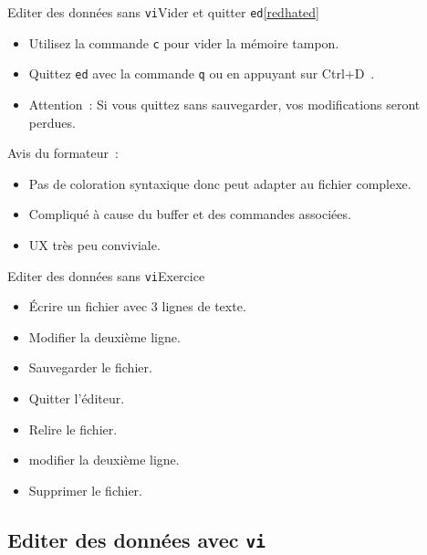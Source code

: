 \documentclass{beamer}
\begin{document}
    \begin{frame}{Editer des données sans \lstinline{vi}}{Vider et quitter \lstinline{ed}\cref{redhated}}
        \begin{itemize}
            \item Utilisez la commande \lstinline{c} pour vider la mémoire tampon.
            \item Quittez \lstinline{ed} avec la commande \lstinline{q} ou en appuyant sur Ctrl+D~.
            \item Attention~: Si vous quittez sans sauvegarder, vos modifications seront perdues.
        \end{itemize}
        \begin{dangercolorbox}
            Avis du formateur~:
            \begin{itemize}
                \item Pas de coloration syntaxique donc peut adapter au fichier complexe.
                \item Compliqué à cause du buffer et des commandes associées.
                \item UX très peu conviviale.
            \end{itemize}
        \end{dangercolorbox}
    \end{frame}

    \begin{frame}{Editer des données sans \lstinline{vi}}{Exercice \execcounterdispinc}
        \begin{itemize}
            \item Écrire un fichier avec 3 lignes de texte.
            \item Modifier la deuxième ligne.
            \item Sauvegarder le fichier.
            \item Quitter l'éditeur.
            \item Relire le fichier.
            \item modifier la deuxième ligne.
            \item Supprimer le fichier.
        \end{itemize}
    \end{frame}

    \subsection{Editer des données avec \lstinline{vi}}\label{subsec:edit-whith-vi}
\end{document}

